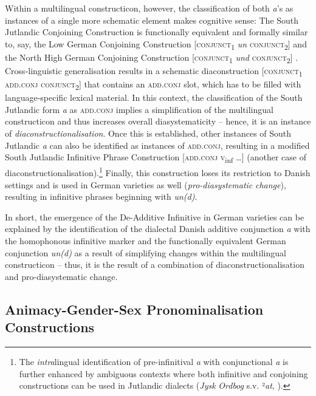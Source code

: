 \documentclass[output=paper]{langsci/langscibook}
\begin{document}
Within a multilingual constructicon, however, the classification of both \textit{a}’s as instances of a single more schematic element makes cognitive sense: The South Jutlandic Conjoining Construction is functionally equivalent and formally similar to, say, the Low German Conjoining Construction {[}\textsc{conjunct}\textsubscript{1} \textit{un} \textsc{conjunct}\textsubscript{2}{]} and the North High German Conjoining Construction {[}\textsc{conjunct}\textsubscript{1} \textit{und} \textsc{conjunct}\textsubscript{2}{]} . Cross-linguistic generalisation results in a schematic diaconstruction {[}\textsc{conjunct}\textsubscript{1} \textsc{add.conj} \textsc{conjunct}\textsubscript{2}{]}  that contains an \textsc{add.conj} slot, which has to be filled with language-specific lexical material. In this context, the classification of the South Jutlandic form \textit{a} as \textsc{add.conj} implies a simplification of the multilingual constructicon and thus increases overall diasystematicity -- hence, it is an instance of \textit{diaconstructionalisation}. Once this is established, other instances of South Jutlandic \textit{a} can also be identified as instances of \textsc{add.conj}, resulting in a modified South Jutlandic Infinitive Phrase Construction {[}\textsc{add.conj} \textsc{v}\textsubscript{inf} …{]}  (another case of diaconstructionalisation).\footnote{The \textit{intra}lingual identification of pre-infinitival \textit{a} with conjunctional \textit{a} is further enhanced by ambiguous contexts where both infinitive and conjoining constructions can be used in Jutlandic dialects (\textit{Jysk} \textit{Ordbog} s.v. ²\textit{at}, ).}\textsuperscript{} Finally, this construction loses its restriction to Danish settings and is used in German varieties as well (\textit{pro-diasystematic} \textit{change}), resulting in infinitive phrases beginning with \textit{un(d)}.

In short, the emergence of the De-Additive Infinitive in German varieties can be explained by the identification of the dialectal Danish additive conjunction \textit{a} with the homophonous infinitive marker and the functionally equivalent German conjunction \textit{un(d)} as a result of simplifying changes within the multilingual constructicon – thus, it is the result of a combination of diaconstructionalisation and pro-diasystematic change.


 
 \subsection{Animacy-Gender-Sex Pronominalisation Constructions}
 \label{sec:hoeder:4.4}
\end{document}
